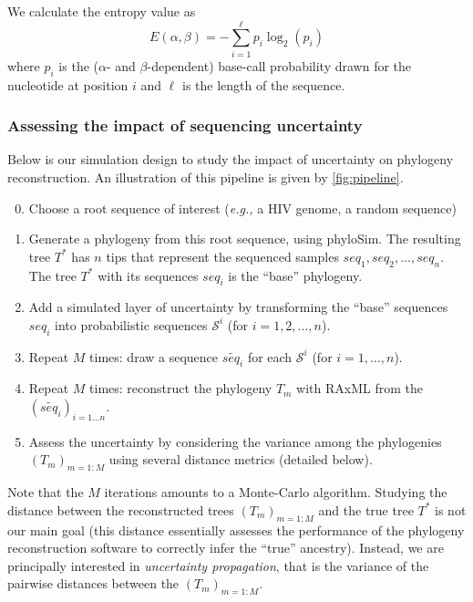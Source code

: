 \documentclass[10pt]{article}
\newcommand{\eg}{\textit{e.g.,}\xspace}
\newcommand{\nps}{\mathcal{S}} %
\begin{document}
We calculate the entropy value as 
\begin{equation}
\label{eq:entropyDefinition}
E(\alpha, \beta) = -\sum_{i=1}^{\ell} p_i \log_2(p_i)
\end{equation}
where $p_i$ is the ($\alpha$- and $\beta$-dependent) base-call probability drawn for the nucleotide at position $i$ and $\ell$ is the length of the sequence.




\subsubsection{Assessing the impact of sequencing uncertainty}


Below is our simulation design to study the impact of uncertainty on phylogeny reconstruction.
An illustration of this pipeline is given by \autoref{fig:pipeline}.

\begin{enumerate}
\setcounter{enumi}{-1} 

\item Choose a root sequence of interest (\eg a HIV genome, a random sequence)

\item Generate a phylogeny from this root sequence, using \textsf{phyloSim}. The resulting tree $T^*$ has $n$ tips that represent the sequenced samples $seq_1, seq_2,\ldots, seq_n$. The tree $T^*$ with its sequences $seq_i$ is the ``base'' phylogeny.

\item Add a simulated layer of uncertainty by transforming the ``base'' sequences $seq_i$ into probabilistic sequences $\nps^i$ (for $i=1,2,\ldots,n$).

\item Repeat $M$ times: 
draw a sequence $\widetilde{seq_i}$ for each $\nps^i$ (for $i=1,\ldots, n$).

\item Repeat $M$ times: reconstruct the phylogeny $T_m$ with \textsf{RAxML} from the $(\widetilde{seq_i})_{i=1\ldots n}$. 

\item \label{item:assess} Assess the uncertainty by considering the variance among the phylogenies $(T_m)_{m=1:M}$ using several distance metrics (detailed below).
\end{enumerate}

\noindent Note that the $M$ iterations amounts to a Monte-Carlo algorithm.
Studying the distance between the reconstructed trees $(T_m)_{m=1:M}$ and the true tree $T^*$ is not our main goal (this distance essentially assesses the performance of the phylogeny reconstruction software to correctly infer the ``true'' ancestry).
Instead, we are principally interested in \emph{uncertainty propagation}, that is the variance of the pairwise distances between the $(T_m)_{m=1:M}$.
\end{document}
